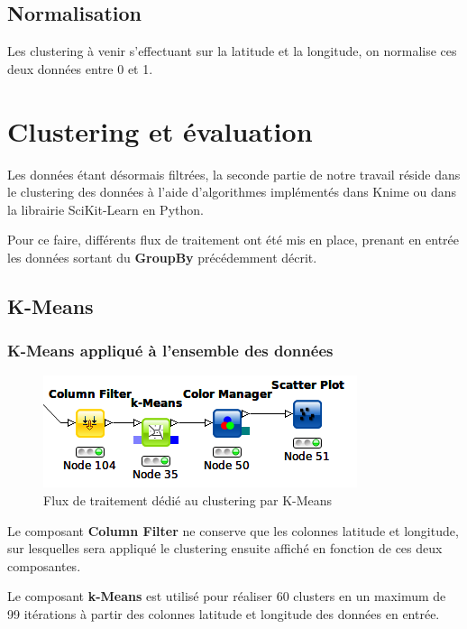 \subsection{Normalisation}
Les clustering à venir s'effectuant sur la latitude et la longitude, on normalise ces deux données entre 0 et 1.
\pagebreak



\section{Clustering et évaluation}
Les données étant désormais filtrées, la seconde partie de notre travail réside dans le clustering des données à l'aide d'algorithmes implémentés dans Knime ou dans la librairie SciKit-Learn en Python.

Pour ce faire, différents flux de traitement ont été mis en place, prenant en entrée les données sortant du \textbf{GroupBy} précédemment décrit.

\subsection{K-Means}
\subsubsection{K-Means appliqué à l'ensemble des données}
\begin{figure}[h!]
    \centering
    \includegraphics[width=\linewidth]{img/knime_k-means_all.png}
    \caption{Flux de traitement dédié au clustering par K-Means}
\end{figure}

Le composant \textbf{Column Filter} ne conserve que les colonnes latitude et longitude, sur lesquelles sera appliqué le clustering ensuite affiché en fonction de ces deux composantes.

Le composant \textbf{k-Means} est utilisé pour réaliser 60 clusters en un maximum de 99 itérations à partir des colonnes latitude et longitude des données en entrée.

